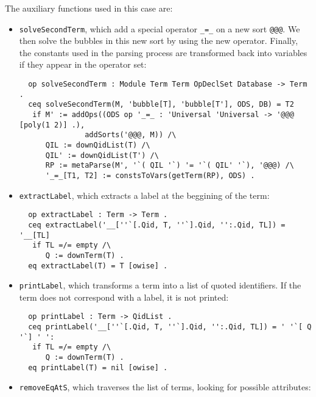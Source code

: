 The auxiliary functions used in this case are:
\begin{itemize}
\item
\verb"solveSecondTerm", which add a special operator \verb"_=_" on a new sort
\verb"@@@". We then solve the bubbles in this new sort by using the new operator.
Finally, the constants used in the parsing process are transformed back into variables
if they appear in the operator set:

{\codesize
\begin{verbatim}
  op solveSecondTerm : Module Term Term OpDeclSet Database -> Term .
  ceq solveSecondTerm(M, 'bubble[T], 'bubble[T'], ODS, DB) = T2
   if M' := addOps((ODS op '_=_ : 'Universal 'Universal -> '@@@ [poly(1 2)] .),
               addSorts('@@@, M)) /\
      QIL := downQidList(T) /\
      QIL' := downQidList(T') /\
      RP := metaParse(M', '`( QIL '`) '= '`( QIL' '`), '@@@) /\
      '_=_[T1, T2] := constsToVars(getTerm(RP), ODS) .
\end{verbatim}
}

{\codesize
\begin{comment}
  *** TODO: quitar cuando acaben las pruebas
  op asd : Term -> QidList .

  eq printCafeBody(T, M, DB, ODS, PL) = < '\r '\! 'Print 'error. asd(T) '\o, ODS > [owise] .
\end{comment}
}

\item
\verb"extractLabel", which extracts a label at the beggining of the term:

{\codesize
\begin{verbatim}
  op extractLabel : Term -> Term .
  ceq extractLabel('__[''`[.Qid, T, ''`].Qid, '':.Qid, TL]) = '__[TL]
   if TL =/= empty /\
      Q := downTerm(T) .
  eq extractLabel(T) = T [owise] .
\end{verbatim}
}

\item
\verb"printLabel", which transforms a term into a list of quoted identifiers.
If the term does not correspond with a label, it is not printed:

{\codesize
\begin{verbatim}
  op printLabel : Term -> QidList .
  ceq printLabel('__[''`[.Qid, T, ''`].Qid, '':.Qid, TL]) = ' '`[ Q '`] ' ':
   if TL =/= empty /\
      Q := downTerm(T) .
  eq printLabel(T) = nil [owise] .
\end{verbatim}
}

\item
\verb"removeEqAtS", which traverses the list of terms, looking for possible
attributes:


\end{itemize}

